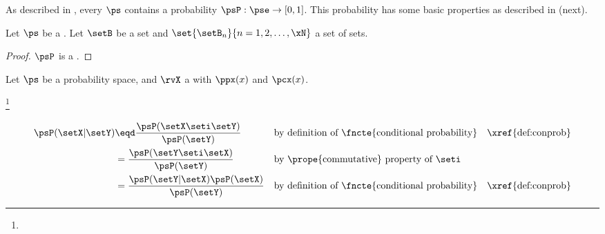 As described in ,
every  $\ps$ contains a probability  $\psP:\pse\to[0,1]$.
This probability  has some basic properties as described in
 (next).
\begin{theorem}
\label{thm:P}
Let $\ps$ be a .
Let $\setB$ be a set and $\set{\setB_n}{n=1,2,\ldots,\xN}$ a set of sets.
\end{theorem}
\begin{proof}
$\psP$ is a .
\end{proof}

\begin{proposition}
\label{prop:cdf_monotone}
Let $\ps$ be a probability space, and $\rvX$ a  
with  $\ppx(x)$ and
 $\pcx(x)$.
\end{proposition}

\begin{theorem}
\footnote{
  }
\thmbox{
  \psP(\setX|\setY) = \frac{\psP(\setY|\setX)\psP(\setX)}{\psP(\setY)}
  }
\end{theorem}
\begin{align*}
  \psP(\setX|\setY)
    &\eqd \frac{\psP(\setX\seti\setY)}{\psP(\setY)}
    && \text{by definition of \fncte{conditional probability}}
    && \text{\xref{def:conprob}}
  \\&= \frac{\psP(\setY\seti\setX)}{\psP(\setY)}
    && \text{by \prope{commutative} property of $\seti$}
  \\&= \frac{\psP(\setY|\setX)\psP(\setX)}{\psP(\setY)}
    && \text{by definition of \fncte{conditional probability}}
    && \text{\xref{def:conprob}}
\end{align*}


